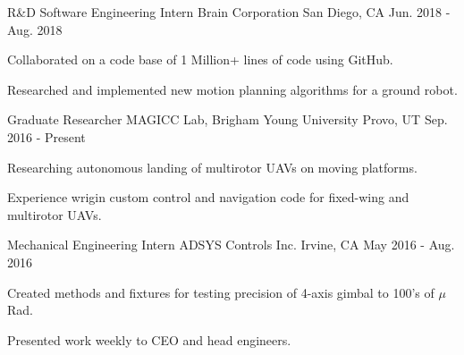 

\begin{cventries}

  \cventry
    {R\&D Software Engineering Intern} %
    {Brain Corporation} %
    {San Diego, CA} %
    {Jun. 2018 - Aug. 2018} %
    {
      \begin{cvitems} %
        \item {Collaborated on a code base of 1 Million+ lines of code using
          GitHub.}
        \item {Researched and implemented new motion planning algorithms for a
          ground robot.}
      \end{cvitems}
    }

  \cventry
    {Graduate Researcher} %
    {MAGICC Lab, Brigham Young University} %
    {Provo, UT} %
    {Sep. 2016 - Present} %
    {
      \begin{cvitems} %
        \item {Researching autonomous landing of multirotor UAVs on moving
          platforms.}
        \item {Experience wrigin custom control and navigation code for
          fixed-wing and multirotor UAVs.}
      \end{cvitems}
    }

  \cventry
    {Mechanical Engineering Intern} %
    {ADSYS Controls Inc.} %
    {Irvine, CA} %
    {May 2016 - Aug. 2016} %
    {
      \begin{cvitems} %
        \item {Created methods and fixtures for testing precision of 4-axis gimbal
          to 100's of $\mu$Rad.}
        \item {Presented work weekly to CEO and head engineers.}
      \end{cvitems}
    }


\end{cventries}
